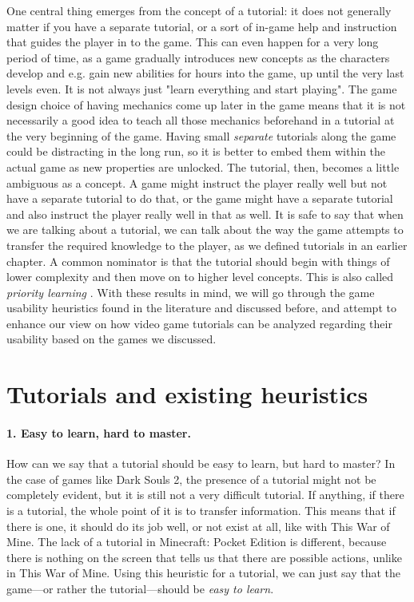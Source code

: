 One central thing emerges from the concept of a tutorial: it does not generally matter if you have a separate tutorial, or a sort of in-game help and instruction that guides the player in to the game. This can even happen for a very long period of time, as a game gradually introduces new concepts as the characters develop and e.g. gain new abilities for hours into the game, up until the very last levels even. It is not always just "learn everything and start playing". The game design choice of having mechanics come up later in the game means that it is not necessarily a good idea to teach all those mechanics beforehand in a tutorial at the very beginning of the game. Having small \textit{separate} tutorials along the game could be distracting in the long run, so it is better to embed them within the actual game as new properties are unlocked. The tutorial, then, becomes a little ambiguous as a concept. A game might instruct the player really well but not have a separate tutorial to do that, or the game might have a separate tutorial and also instruct the player really well in that as well. It is safe to say that when we are talking about a tutorial, we can talk about the way the game attempts to transfer the required knowledge to the player, as we defined tutorials in an earlier chapter. A common nominator is that the tutorial should begin with things of lower complexity and then move on to higher level concepts. This is also called \textit{priority learning} \cite{Bycer2016}. With these results in mind, we will go through the game usability heuristics found in the literature and discussed before, and attempt to enhance our view on how video game tutorials can be analyzed regarding their usability based on the games we discussed.

\section{Tutorials and existing heuristics}
\paragraph{1. Easy to learn, hard to master.} How can we say that a tutorial should be easy to learn, but hard to master? In the case of games like Dark Souls 2, the presence of a tutorial might not be completely evident, but it is still not a very difficult tutorial. If anything, if there is a tutorial, the whole point of it is to transfer information. This means that if there is one, it should do its job well, or not exist at all, like with This War of Mine. The lack of a tutorial in Minecraft: Pocket Edition is different, because there is nothing on the screen that tells us that there are possible actions, unlike in This War of Mine. Using this heuristic for a tutorial, we can just say that the game---or rather the tutorial---should be \textit{easy to learn}.

